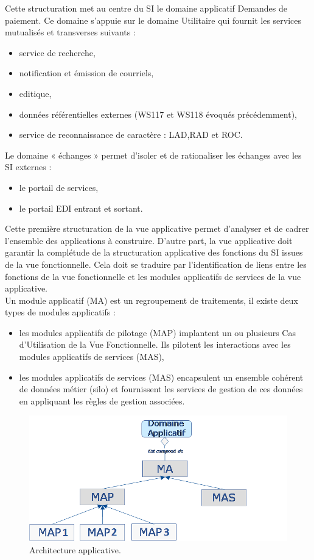 \documentclass[12pt,a4paper]{article}
\begin{document}
Cette structuration met au centre du SI le domaine applicatif Demandes de paiement.
Ce domaine s’appuie sur le domaine Utilitaire qui fournit les services mutualisés et transverses suivants :
\begin{itemize}
\item	service de recherche,
\item	notification et émission de courriels,
\item	editique,
\item	données référentielles externes (WS117 et WS118 évoqués précédemment),
\item	service de reconnaissance de caractère : \gls{LAD},\gls{RAD} et \gls{ROC}.
\end{itemize}
Le domaine « échanges » permet d’isoler et de rationaliser les échanges avec les SI externes :
\begin{itemize}
\item	le portail de services,
\item	le portail EDI entrant et sortant.
\end{itemize}
Cette première structuration de la vue applicative permet d’analyser et de cadrer l’ensemble des applications à construire. D’autre part, la vue applicative doit garantir la complétude de la structuration applicative des fonctions du SI issues de la vue fonctionnelle. Cela doit se traduire par l’identification de liens entre les fonctions de la vue fonctionnelle et les modules applicatifs de services de la vue applicative.\\
Un module applicatif (MA) est un regroupement de traitements, il existe deux types de modules applicatifs :
\begin{itemize}
\item les modules applicatifs de pilotage (MAP) implantent un ou plusieurs Cas d’Utilisation de la Vue Fonctionnelle. Ils pilotent les interactions avec les modules applicatifs de services (MAS),\\
\item les modules applicatifs de services (MAS) encapsulent un ensemble cohérent de données métier (silo) et fournissent les services de gestion de ces données en appliquant les règles de gestion associées.
\end{itemize}
\begin{figure}[H]
	\begin{center}
		\includegraphics[width=\textwidth, height=\textheight, keepaspectratio]{archiApplicative.png}
		\caption{Architecture applicative.}
	\end{center}
\end{figure}
\clearpage
\newpage
\end{document}
